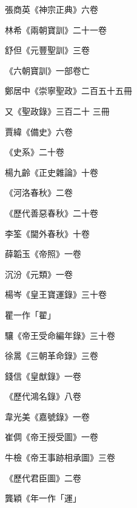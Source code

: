 \begin{pinyinscope}
 張商英《神宗正典》六卷



 林希《兩朝寶訓》二十一卷



 舒但《元豐聖訓》三卷



 《六朝寶訓》一部卷亡



 鄭居中《崇寧聖政》二百五十五冊



 又《聖政錄》三百二十
 三冊



 賈緯《備史》六卷



 《史系》二十卷



 楊九齡《正史雜論》十卷



 《河洛春秋》二卷



 《歷代善惡春秋》二十卷



 李筌《閫外春秋》十卷



 薛韜玉《帝照》一卷



 沉汾《元類》一卷



 楊岑《皇王寶運錄》三十卷



 瞿一作「翟」



 驤《帝王受命編年錄》三十卷



 徐暠《三朝革命錄》三卷



 錢信《皇猷錄》一卷



 《歷代鴻名錄》八卷



 韋光美《嘉號錄》一卷



 崔倜《帝王授受圖》一卷



 牛檢《帝王事跡相承圖》三卷



 《歷代君臣圖》二卷



 龔穎《年一作「運」




\end{pinyinscope}
